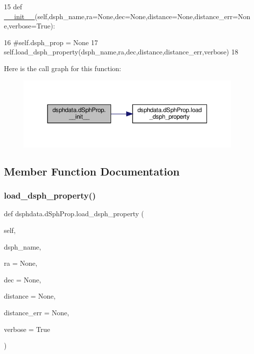 \begin{DoxyCode}
15     \textcolor{keyword}{def }\hyperlink{classsampler_1_1Sampler_a0ebbb93e5c948bc426658cbdc92bfd12}{\_\_init\_\_}(self,dsph\_name,ra=None,dec=None,distance=None,distance\_err=None,verbose=True):    
          
16         \textcolor{comment}{#self.dsph\_prop = None}
17         self.load\_dsph\_property(dsph\_name,ra,dec,distance,distance\_err,verbose)
18         
\end{DoxyCode}
Here is the call graph for this function\+:\nopagebreak
\begin{figure}[H]
\begin{center}
\leavevmode
\includegraphics[width=344pt]{d7/dcd/classdsphdata_1_1dSphProp_ae1a65e0fa31a216d8682f7b0c82a17bc_cgraph}
\end{center}
\end{figure}


\subsection{Member Function Documentation}
\mbox{\label{classdsphdata_1_1dSphProp_a137f39efeed4c5ac45617e401d500a12}} 
\subsubsection{\texorpdfstring{load\+\_\+dsph\+\_\+property()}{load\_dsph\_property()}}
{\footnotesize\ttfamily def dsphdata.\+d\+Sph\+Prop.\+load\+\_\+dsph\+\_\+property (\begin{DoxyParamCaption}\item[{}]{self,  }\item[{}]{dsph\+\_\+name,  }\item[{}]{ra = {\ttfamily None},  }\item[{}]{dec = {\ttfamily None},  }\item[{}]{distance = {\ttfamily None},  }\item[{}]{distance\+\_\+err = {\ttfamily None},  }\item[{}]{verbose = {\ttfamily True} }\end{DoxyParamCaption})}



